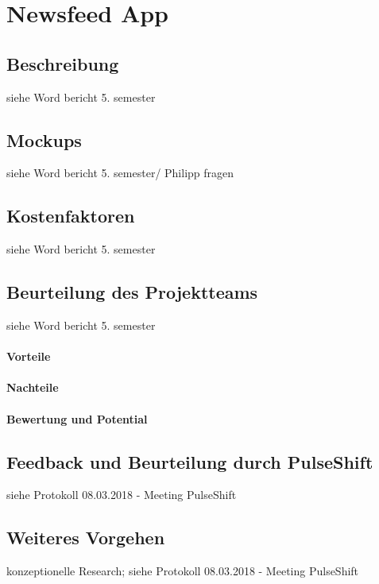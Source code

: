 \section{Newsfeed App}
\label{section:newsfeed_app}

\subsection{Beschreibung}

siehe Word bericht 5. semester

\subsection{Mockups}

siehe Word bericht 5. semester/ Philipp fragen

\subsection{Kostenfaktoren}

siehe Word bericht 5. semester

\subsection{Beurteilung des Projektteams}

siehe Word bericht 5. semester

\paragraph{Vorteile}

\paragraph{Nachteile}

\paragraph{Bewertung und Potential}

\subsection{Feedback und Beurteilung durch PulseShift}

siehe Protokoll 08.03.2018 - Meeting PulseShift

\subsection{Weiteres Vorgehen}

konzeptionelle Research; siehe Protokoll 08.03.2018 - Meeting PulseShift
